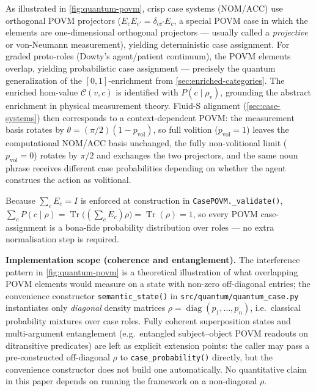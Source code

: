 \documentclass[
]{article}
\begin{document}
As illustrated in \autoref{fig:quantum-povm}, crisp case systems
(NOM/ACC) use orthogonal POVM projectors
(\(E_c E_{c'} = \delta_{cc'} E_c\), a special POVM case in which the
elements are one-dimensional orthogonal projectors --- usually called a
\emph{projective} or von-Neumann measurement), yielding deterministic
case assignment. For graded proto-roles (Dowty's
\citeyearpar{dowty1991thematic} agent/patient continuum), the POVM
elements overlap, yielding probabilistic case assignment --- precisely
the quantum generalization of the \([0,1]\)-enrichment from
\autoref{sec:enriched-categories}. The enriched hom-value
\(\mathcal{C}(v, c)\) is identified with \(P(c \mid \rho_v)\), grounding
the abstract enrichment in physical measurement theory. Fluid-S
alignment (\autoref{sec:case-systems}) then corresponds to a
context-dependent POVM: the measurement basis rotates by
\(\theta = (\pi/2)(1 - p_{\text{vol}})\), so full volition
(\(p_{\text{vol}}=1\)) leaves the computational NOM/ACC basis unchanged,
the fully non-volitional limit (\(p_{\text{vol}}=0\)) rotates by
\(\pi/2\) and exchanges the two projectors, and the same noun phrase
receives different case probabilities depending on whether the agent
construes the action as volitional.

Because \(\sum_c E_c = I\) is enforced at construction in
\texttt{CasePOVM.\_validate()},
\(\sum_c P(c \mid \rho) = \operatorname{Tr}\!\bigl((\sum_c E_c)\rho\bigr) = \operatorname{Tr}(\rho) = 1\),
so every POVM case-assignment is a bona-fide probability distribution
over roles --- no extra normalisation step is required.

\textbf{Implementation scope (coherence and entanglement).} The
interference pattern in \autoref{fig:quantum-povm} is a theoretical
illustration of what overlapping POVM elements would measure on a state
with non-zero off-diagonal entries; the convenience constructor
\texttt{semantic\_state()} in \texttt{src/quantum/quantum\_case.py}
instantiates only \emph{diagonal} density matrices
\(\rho = \operatorname{diag}(p_1,\dots,p_n)\), i.e.~classical
probability mixtures over case roles. Fully coherent superposition
states and multi-argument entanglement (e.g.~entangled subject--object
POVM readouts on ditransitive predicates) are left as explicit extension
points: the caller may pass a pre-constructed off-diagonal \(\rho\) to
\texttt{case\_probability()} directly, but the convenience constructor
does not build one automatically. No quantitative claim in this paper
depends on running the framework on a non-diagonal \(\rho\).
\end{document}
